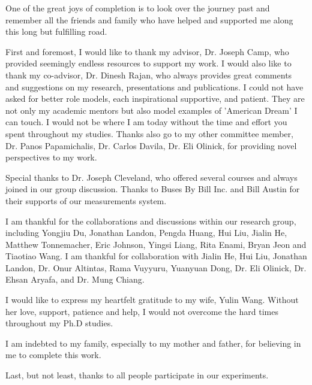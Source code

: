 One of the great joys of completion is to look over the journey past and remember
all the friends and family who have helped and supported me along this long but 
fulfilling road. 

First and foremost, I would like to thank my advisor, Dr. Joseph Camp, who 
provided seemingly endless resources to support my work. I would also like to thank 
my co-advisor, Dr. Dinesh Rajan, who always provides great comments and suggestions on 
my research, presentations and publications. 
I could not have asked for better role models, each inspirational supportive, and patient.
They are not only my academic mentors but also model examples of 'American Dream' I can 
touch. 
I would not be where I am today without the time and effort you spent throughout my 
studies. 
Thanks also go to my other committee member, Dr. Panos Papamichalis, 
Dr. Carlos Davila, Dr. Eli Olinick, for providing novel perspectives to my work.

Special thanks to Dr. Joseph Cleveland, who offered several courses and always joined in 
our group discussion. Thanks to Buses By Bill Inc. and Bill Austin for their supports of 
our measurements system.

I am thankful for the collaborations and discussions within our research group, 
including Yongjiu Du, Jonathan Landon, Pengda Huang, Hui Liu, Jialin He, Matthew Tonnemacher, 
Eric Johnson, Yingsi Liang, Rita Enami, Bryan Jeon and Tiaotiao Wang. I am thankful for collaboration 
with Jialin He, Hui Liu, Jonathan Landon, Dr. Onur Altintas, Rama Vuyyuru, 
Yuanyuan Dong, Dr. Eli Olinick, Dr. Ehsan Aryafa, and Dr. Mung Chiang.

I would like to express my heartfelt gratitude to my wife, Yulin Wang. Without her love, 
support, patience and help, I would not overcome the hard times throughout my Ph.D studies.

I am indebted to my family, especially to my mother and father, for 
believing in me to complete this work.

Last, but not least, thanks to all people participate in our experiments.



